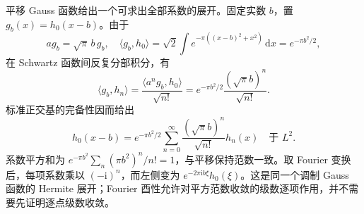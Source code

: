 平移 Gauss 函数给出一个可求出全部系数的展开。固定实数 \(b\)，置 \(g_b(x)=h_0(x-b)\)。由于
\[
 ag_b=\sqrt\pi\,b\,g_b,
 \quad\langle g_b,h_0\rangle
 =\sqrt2\int e^{-\pi((x-b)^2+x^2)}\,\mathrm{d}x
 =e^{-\pi b^2/2},
\]
在 Schwartz 函数间反复分部积分，有
\[
 \langle g_b,h_n\rangle
 =\frac{\langle a^ng_b,h_0\rangle}{\sqrt{n!}}
 =e^{-\pi b^2/2}\frac{(\sqrt\pi b)^n}{\sqrt{n!}}.
\]
标准正交基的完备性因而给出
\[
 h_0(x-b)=e^{-\pi b^2/2}
 \sum_{n=0}^\infty\frac{(\sqrt\pi b)^n}{\sqrt{n!}}h_n(x)
 \quad\text{于 }L^2.
\]
系数平方和为 \(e^{-\pi b^2}\sum_n(\pi b^2)^n/n!=1\)，与平移保持范数一致。取 Fourier 变换后，每项系数乘以 \((-\mathrm{i})^n\)，而左侧变为 \(e^{-2\pi\mathrm{i}b\xi}h_0(\xi)\)。这是同一个调制 Gauss 函数的 Hermite 展开；Fourier 酉性允许对平方范数收敛的级数逐项作用，并不需要先证明逐点级数收敛。
